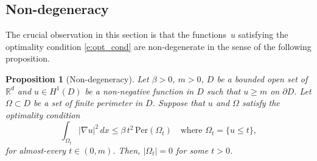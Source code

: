 \documentclass[JEP,XML,SOM,Unicode]{cedram}
\newcommand{\Per}{\mathrm{Per}}
\theoremstyle{plain}
\newtheorem{prop}[teo]{Proposition}
\theoremstyle{definition}
\def\R{\mathbb{R}}
\begin{document}
\subsection{Non-degeneracy} The crucial observation in this section is that the functions~$u$ satisfying the optimality condition \eqref{e:opt_cond} are non-degenerate in the sense of the following proposition.
\begin{prop}[Non-degeneracy]\label{p:non-degeneracy}
Let $\beta>0$, $m>0$, $D$ be a bounded open set of $\R^d$ and $u\in H^1(D)$ be a non-negative function in $D$ such that $u\ge m$ on $\partial D$. Let $\Omega\subset D$ be a set of finite perimeter in $D$. Suppose that $u$ and $\Omega$ satisfy the optimality condition
\begin{equation}\label{e:opt_cond_nd}
\int_{\Omega_t}|\nabla u|^2\,dx\le \beta\, t^2\, \Per(\Omega_t)\quad\text{where }\Omega_t=\{u\le t\},
\end{equation}
for almost-every $t\in(0,m)$. Then, $|\Omega_t|=0$ for some $t>0$.
\end{prop}
\end{document}
